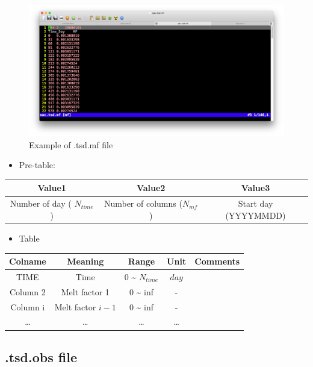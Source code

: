 \documentclass[
]{scrbook}
\providecommand{\tightlist}{%
  \setlength{\itemsep}{0pt}\setlength{\parskip}{0pt}}
\begin{document}
\begin{figure}
\centering
\includegraphics{Fig/IO/tsd.mf.png}
\caption{Example of .tsd.mf file}
\end{figure}

\begin{itemize}
\tightlist
\item
  Pre-table:
\end{itemize}

\begin{longtable}[]{@{}ccc@{}}
\toprule
Value1 & Value2 & Value3\tabularnewline
\midrule
\endhead
Number of day ( \(N_{time}\)) & Number of columns (\(N_{mf}\)) & Start day (YYYYMMDD)\tabularnewline
\bottomrule
\end{longtable}

\begin{itemize}
\tightlist
\item
  Table
\end{itemize}

\begin{longtable}[]{@{}ccccc@{}}
\toprule
Colname & Meaning & Range & Unit & Comments\tabularnewline
\midrule
\endhead
TIME & Time & 0 \textasciitilde{} \(N_{time}\) & \(day\) &\tabularnewline
Column 2 & Melt factor 1 & 0 \textasciitilde{} inf & - &\tabularnewline
Column i & Melt factor \(i-1\) & 0 \textasciitilde{} inf & - &\tabularnewline
\ldots{} & \ldots{} & \ldots{} & \ldots{} &\tabularnewline
\bottomrule
\end{longtable}

\hypertarget{tsd.obs-file}{%
\subsection{.tsd.obs file}\label{tsd.obs-file}}
\end{document}
